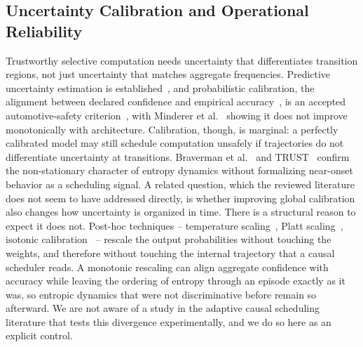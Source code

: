 \documentclass[a4paper,fleqn]{cas-dc}
\begin{document}
\subsection{Uncertainty Calibration and Operational Reliability}
\label{sec:rel_uncertainty}
Trustworthy selective computation needs uncertainty that differentiates transition regions, not just uncertainty that matches aggregate frequencies. Predictive uncertainty estimation is established~\cite{gal2016dropout,lakshminarayanan2017simple,hein2019relu}, and probabilistic calibration, the alignment between declared confidence and empirical accuracy~\cite{guo2017calibration}, is an accepted automotive-safety criterion~\cite{tang2022uv,michelmore2020uq}, with Minderer et al.~\cite{minderer2021revisiting} showing it does not improve monotonically with architecture. Calibration, though, is marginal: a perfectly calibrated model may still schedule computation unsafely if trajectories do not differentiate uncertainty at transitions. Braverman et al.~\cite{braverman2020calib} and TRUST~\cite{dera2023trust} confirm the non-stationary character of entropy dynamics without formalizing near-onset behavior as a scheduling signal.
A related question, which the reviewed literature does not seem to have addressed
directly, is whether improving global calibration also changes how uncertainty is
organized in time. There is a structural reason to expect it does not. Post-hoc
techniques -- temperature scaling~\cite{guo2017calibration}, Platt
scaling~\cite{platt1999probabilistic}, isotonic
calibration~\cite{zadrozny2002isotonic} -- rescale the output probabilities without
touching the weights, and therefore without touching the internal trajectory that a
causal scheduler reads. A monotonic rescaling can align aggregate confidence with
accuracy while leaving the ordering of entropy through an episode exactly as it was,
so entropic dynamics that were not discriminative before remain so afterward. We are
not aware of a study in the adaptive causal scheduling literature that tests this
divergence experimentally, and we do so here as an explicit control.
\end{document}
